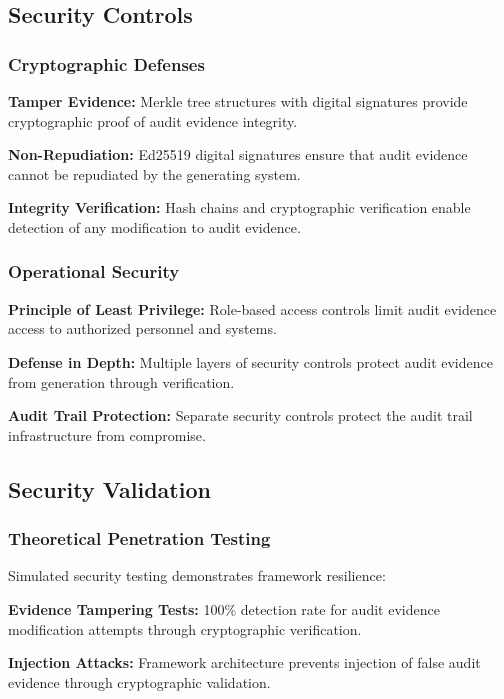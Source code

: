 \documentclass[12pt,a4paper]{article}
\begin{document}
\subsection{Security Controls}

\subsubsection{Cryptographic Defenses}

\textbf{Tamper Evidence:} Merkle tree structures with digital signatures provide cryptographic proof of audit evidence integrity.

\textbf{Non-Repudiation:} Ed25519 digital signatures ensure that audit evidence cannot be repudiated by the generating system.

\textbf{Integrity Verification:} Hash chains and cryptographic verification enable detection of any modification to audit evidence.

\subsubsection{Operational Security}

\textbf{Principle of Least Privilege:} Role-based access controls limit audit evidence access to authorized personnel and systems.

\textbf{Defense in Depth:} Multiple layers of security controls protect audit evidence from generation through verification.

\textbf{Audit Trail Protection:} Separate security controls protect the audit trail infrastructure from compromise.

\subsection{Security Validation}

\subsubsection{Theoretical Penetration Testing}

Simulated security testing demonstrates framework resilience:

\textbf{Evidence Tampering Tests:} 100\% detection rate for audit evidence modification attempts through cryptographic verification.

\textbf{Injection Attacks:} Framework architecture prevents injection of false audit evidence through cryptographic validation.
\end{document}
